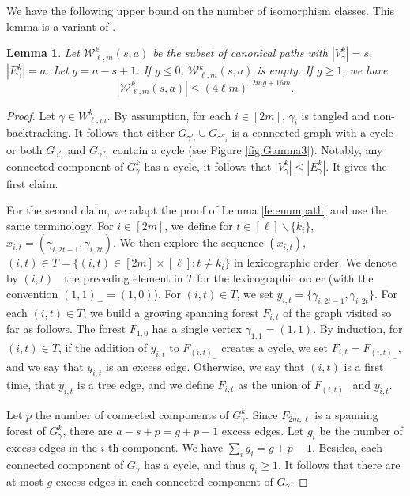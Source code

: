 \documentclass[11pt]{article}
\newtheorem{lemma}{Lemma}
\newcommand{\cE}{E}
\newcommand{\cW}{\mathcal {W}}
\newcommand{\1}{1\!\!{\sf I}}\newcommand{\IND}{\1}
\begin{document}
We have the following upper bound on the number of isomorphism classes. This lemma is  a variant of \cite[Lemma 18]{BLM}.

\begin{lemma}\label{le:enumpath0}
Let $\cW^k_{\ell,m} (s,a) $ be the subset of canonical paths with $|V_\gamma^k| = s$, $|\cE_\gamma ^k|= a$. Let $g = a - s +1$. If $g \leq 0$, $\cW^k_{\ell,m} (s,a)$ is empty. If $g \geq 1$, we have 
$$
| \cW^k_{\ell,m} (s,a) | \leq  (4 \ell  m )^{12 m g  + 16 m}.
$$
\end{lemma}

\begin{proof}
Let $\gamma \in W_{\ell,m} ^k$. By assumption, for each $i \in [2m]$, $\gamma_i$ is tangled and non-backtracking. It follows that either $G_{\gamma'_i} \cup G_{\gamma''_i}$ is a connected graph with a cycle or both $G_{\gamma'_i}$ and $G_{\gamma''_i}$ contain a cycle (see Figure \ref{fig:Gamma3}).  Notably,   any connected component of $G^k_{\gamma}$ has a cycle, it follows that $|V^k_\gamma|  \leq |\cE^k_\gamma| $. It gives the first claim. 


For the second claim, we adapt the proof of Lemma \ref{le:enumpath} and use the same terminology. For $i \in [2m]$, we define for $t \in [\ell]\backslash\{k_i\}$, $x_{i,t} = ( \gamma_{i,2t-1}, \gamma_{i,2t} )$. We then explore the sequence $(x_{i,t})$, $(i,t) \in T = \{ (i,t) \in [2m] \times [\ell] : t \ne k_i \}$ in lexicographic order. We denote by $(i,t)_-$ the preceding element in $T$ for the lexicographic order (with the convention $(1,1)_- = (1,0)$). For $(i,t) \in T$, we set $y_{i,t} = \{  \gamma_{i,2t-1}, \gamma_{i,2t} \}$. For each $(i,t) \in T$, we build a growing spanning forest $F_{i,t}$ of the graph visited so far as follows. The forest $F_{1,0}$ has a single vertex $\gamma_{1,1} = (1,1)$. By induction, for $(i,t) \in T$,  if the addition of $y_{i,t}$ to $F_{(i,t)_-}$  creates a cycle, we set $F_{i,t} = F_{(i,t)_-}$, and we say that  $y_{i,t}$ is an excess edge. Otherwise, we say that $(i,t)$ is a first time, that $y_{i,t}$ is a tree edge, and we define $F_{i,t}$ as the union of $F_{(i,t)_-}$ and $y_{i,t}$. 


Let $p$  the number of connected components of $G^k_\gamma$. Since $F_{2m,\ell}$ is a spanning forest of $G^k_\gamma$, there are $a -s + p  = g + p-1$ excess edges. Let $g_i$ be the number of excess edges in the $i$-th component. We have $\sum_i g_i = g + p-1$. Besides, each connected component of $G_\gamma$ has a cycle, and thus $g_i \geq 1$. It follows that there are at most  $g$ excess edges in each connected component of $G_{\gamma}$.   


\end{proof}
\end{document}
